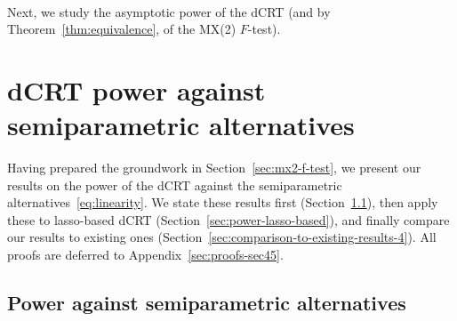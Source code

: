 \documentclass[12pt]{article}
\theoremstyle{definition}
\theoremstyle{remark}
\newcommand{\prx}{\bm X}
\newcommand{\prz}{\bm Z}
\newcommand{\pry}{{\bm Y}}
\begin{document}
\paragraph{}

Next, we study the asymptotic power of the dCRT (and by Theorem~\ref{thm:equivalence}, of the MX(2) $F$-test). 

%	


\section{dCRT power against semiparametric alternatives} \label{sec:asymptotic-power}

Having prepared the groundwork in Section~\ref{sec:mx2-f-test}, we present our results on the power of the dCRT against the semiparametric alternatives~\eqref{eq:linearity}. We state these results first (Section~\ref{sec:power-results}), then apply these to lasso-based dCRT (Section~\ref{sec:power-lasso-based}), and finally compare our results to existing ones (Section~\ref{sec:comparison-to-existing-results-4}). All proofs are deferred to Appendix~\ref{sec:proofs-sec45}.

\subsection{Power against semiparametric alternatives} \label{sec:power-results}
\end{document}

